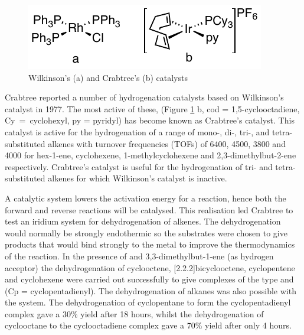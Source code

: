 \begin{figure}[ht]
\centering
\includegraphics[]{../Figures/Wilkinsoncrabtree.pdf}
\caption[Wilkinson's and Crabtree's catalysts]{Wilkinson's (a) and Crabtree's (b) catalysts}
\label{Wilkinsoncrabtree}
\end{figure}

Crabtree reported a number of hydrogenation catalysts based on Wilkinson's catalyst in 1977.\cite{Crabtree1977} The most active of these,  (Figure \ref{Wilkinsoncrabtree} b, \gls{cod} = 1,5-cyclooctadiene, \gls{Cy}~=~cyclohexyl, \gls{py} = pyridyl) has become known as Crabtree's catalyst.\cite{Cui2005}  This catalyst is active for the hydrogenation of a range of \hbox{mono-,} di-, \hbox{tri-,} and \hbox{tetra-substituted} alkenes with turnover frequencies (\glspl{TOF}) of 6400, 4500, 3800 and 4000 for hex-1-ene, cyclohexene, 1-methylcyclohexene and 2,3-dimethylbut-2-ene respectively.\cite{Crabtree1979b}  Crabtree's catalyst is useful for the hydrogenation of tri- and tetra-substituted alkenes for which Wilkinson's catalyst is inactive.\cite{Cui2005}

A catalytic system lowers the activation energy for a reaction, hence both the forward and reverse reactions will be catalysed.\cite{Crabtree2001}  This realisation led Crabtree to test an iridium system for dehydrogenation of alkenes.\cite{Crabtree1979}  The dehydrogenation would normally be strongly endothermic so the substrates were chosen to give products that would bind strongly to the metal to improve the thermodynamics of the reaction.  In the presence of  and 3,3-dimethylbut-1-ene (as hydrogen acceptor) the dehydrogenation of cyclooctene, [2.2.2]bicyclooctene, cyclopentene and cyclohexene were carried out successfully to give complexes of the type  and \ce{[Ir(Cp)H(PPh3)]+} (Cp = cyclopentadienyl).\cite{Crabtree1979}  The dehydrogenation of alkanes was also possible with the system.  The dehydrogenation of cyclopentane to form the cyclopentadienyl complex gave a 30\% yield after 18 hours, whilst the dehydrogenation of cyclooctane to the cyclooctadiene complex gave a 70\% yield after only 4 hours.\cite{Crabtree1979}

